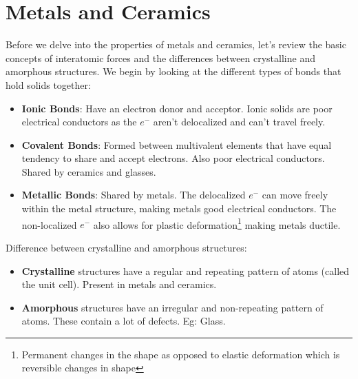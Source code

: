 \documentclass[12pt]{article}
\begin{document}
\section{Metals and Ceramics}
Before we delve into the properties of metals and ceramics, let's review the
basic concepts of interatomic forces and the differences between crystalline
and amorphous structures. We begin by looking at the different types of bonds
that hold solids together:
\begin{itemize}
    \item \textbf{Ionic Bonds}: Have an electron donor and acceptor. Ionic solids are poor electrical conductors as the $e^{-}$ aren't delocalized and can't travel freely.
    \item \textbf{Covalent Bonds}: Formed between multivalent elements that have equal tendency to share and accept electrons. Also poor electrical conductors. Shared by ceramics and glasses.
    \item \textbf{Metallic Bonds}: Shared by metals. The delocalized $e^{-}$ can move freely within the metal structure, making metals good electrical conductors. The non-localized $e^{-}$ also allows for plastic deformation\footnote{Permanent changes in the shape as opposed to elastic deformation which is reversible changes in shape} making metals ductile.
\end{itemize}

\noindent
Difference between crystalline and amorphous structures:
\begin{itemize}
    \item \textbf{Crystalline} structures have a regular and repeating pattern of atoms (called the unit cell). Present in metals and ceramics.
    \item \textbf{Amorphous} structures have an irregular and non-repeating pattern of atoms. These contain a lot of defects. Eg: Glass.
\end{itemize}
\end{document}
